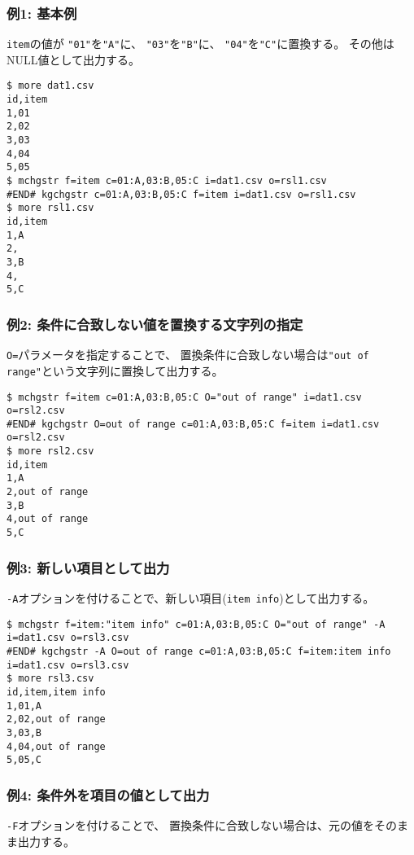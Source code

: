 \subsubsection*{例1: 基本例}

\verb|item|の値が
\verb|"01"|を\verb|"A"|に、
\verb|"03"|を\verb|"B"|に、
\verb|"04"|を\verb|"C"|に置換する。
その他はNULL値として出力する。


\begin{Verbatim}[baselinestretch=0.7,frame=single]
$ more dat1.csv
id,item
1,01
2,02
3,03
4,04
5,05
$ mchgstr f=item c=01:A,03:B,05:C i=dat1.csv o=rsl1.csv
#END# kgchgstr c=01:A,03:B,05:C f=item i=dat1.csv o=rsl1.csv
$ more rsl1.csv
id,item
1,A
2,
3,B
4,
5,C
\end{Verbatim}
\subsubsection*{例2: 条件に合致しない値を置換する文字列の指定}

\verb|O=|パラメータを指定することで、
置換条件に合致しない場合は\verb|"out of range"|という文字列に置換して出力する。


\begin{Verbatim}[baselinestretch=0.7,frame=single]
$ mchgstr f=item c=01:A,03:B,05:C O="out of range" i=dat1.csv o=rsl2.csv
#END# kgchgstr O=out of range c=01:A,03:B,05:C f=item i=dat1.csv o=rsl2.csv
$ more rsl2.csv
id,item
1,A
2,out of range
3,B
4,out of range
5,C
\end{Verbatim}
\subsubsection*{例3: 新しい項目として出力}

\verb|-A|オプションを付けることで、新しい項目(\verb|item info|)として出力する。


\begin{Verbatim}[baselinestretch=0.7,frame=single]
$ mchgstr f=item:"item info" c=01:A,03:B,05:C O="out of range" -A i=dat1.csv o=rsl3.csv
#END# kgchgstr -A O=out of range c=01:A,03:B,05:C f=item:item info i=dat1.csv o=rsl3.csv
$ more rsl3.csv
id,item,item info
1,01,A
2,02,out of range
3,03,B
4,04,out of range
5,05,C
\end{Verbatim}
\subsubsection*{例4: 条件外を項目の値として出力}

\verb|-F|オプションを付けることで、
置換条件に合致しない場合は、元の値をそのまま出力する。


